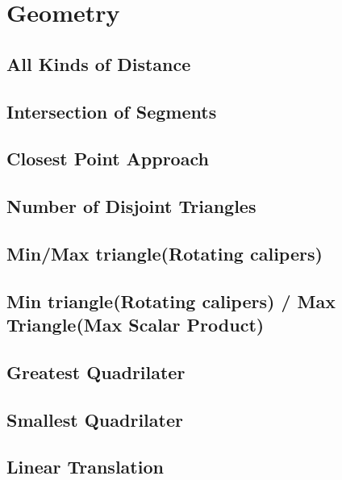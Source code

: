 \section{Geometry}
\subsection{All Kinds of Distance}
\raggedbottom
\hrulefill
\subsection{Intersection of Segments}
\raggedbottom
\hrulefill
\subsection{Closest Point Approach}
\raggedbottom
\hrulefill
\subsection{Number of Disjoint Triangles}
\raggedbottom
\hrulefill
\subsection{Min/Max triangle(Rotating calipers)}
\raggedbottom
\hrulefill
\subsection{Min triangle(Rotating calipers) / Max Triangle(Max Scalar Product)}
\raggedbottom
\hrulefill
\subsection{Greatest Quadrilater}
\raggedbottom
\hrulefill
\subsection{Smallest Quadrilater}
\raggedbottom
\hrulefill
\subsection{Linear Translation}
\raggedbottom
\hrulefill

